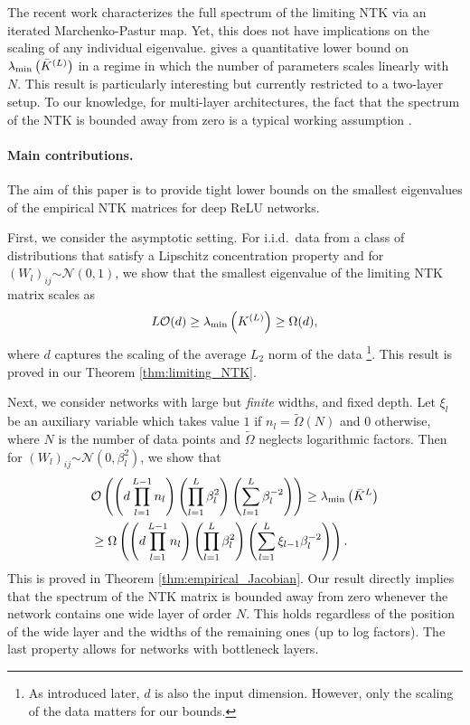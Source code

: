 \documentclass[11pt]{article}
\def\Set#1{\left\{ #1 \right\}}
\newcommand{\distas}[1]{\mathbin{\overset{#1}{\sim}}}
\newcommand{\evmin}[1]{\lambda_{\rm min}\left(#1\right)}
\def\min{\mathop{\rm min}\nolimits}
\begin{document}
The recent work \citep{fan2020spectra} characterizes the full spectrum of
the limiting NTK via an iterated Marchenko-Pastur map.
Yet, this does not have implications on the scaling of any individual eigenvalue.
\citep{Andrea2020} gives a quantitative lower bound on $\evmin{\bar{K}^{(L)}}$ 
in a regime in which the number of parameters scales linearly with $N.$
This result is particularly interesting but currently restricted to a two-layer setup.
To our knowledge, for multi-layer architectures, 
the fact that the spectrum of the NTK is bounded away from zero is a typical working assumption \citep{DuEtal2019, HuangYau2020}.

\paragraph{Main contributions.} 
The aim of this paper is to provide tight lower bounds on the smallest eigenvalues of the empirical NTK matrices for deep ReLU networks.

First, we consider the asymptotic setting.
For i.i.d.\ data from a class of distributions that satisfy a Lipschitz concentration property
and for $(W_l)_{ij}\distas{}\mathcal{N}(0,1)$,
we show that the smallest eigenvalue of the limiting NTK matrix scales as
\begin{align}\label{eq:fast1}
    L\mathcal{O}(d) \geq 
    \evmin{K^{(L)}}
    \geq \Omega(d),
\end{align}
where $d$ captures the scaling of the average $L_2$ norm of the data 
\footnote{As introduced later, $d$ is also the input dimension. However, only the scaling of the data matters for our bounds.}.
This result is proved in our Theorem \ref{thm:limiting_NTK}.

Next, we consider networks with large but {\em finite} widths, and fixed depth.
Let $\xi_l$ be an auxiliary variable which takes value $1$ if $n_l=\tilde{\Omega}(N)$ and $0$ otherwise, 
where $N$ is the number of data points and $\tilde{\Omega}$ neglects logarithmic factors.
Then for $(W_l)_{ij}\distas{}\mathcal{N}(0,\beta_l^2)$, we show that
\begin{align}\label{eq:fast2}
    &\mathcal{O}\left(\left(d\prod_{l=1}^{L-1}n_l\right)\left(\prod_{l=1}^{L}\beta_l^2\right)\left(\sum_{l=1}^{L}\beta_l^{-2}\right)\right)
    \geq \evmin{\bar{K}^L} \nonumber \\
    &\geq \Omega\left(\left(d\prod_{l=1}^{L-1}n_l\right)\left(\prod_{l=1}^{L}\beta_l^2\right)\left(\sum_{l=1}^{L}\xi_{l-1}\beta_l^{-2}\right)\right) .
\end{align}
This is proved in Theorem \ref{thm:empirical_Jacobian}.
Our result directly implies that the spectrum of the NTK matrix is bounded away from zero whenever the network contains one wide layer of order $N$. 
This holds regardless of the position of the wide layer and the widths of the remaining ones (up to log factors).
The last property allows for networks with bottleneck layers.
\end{document}

